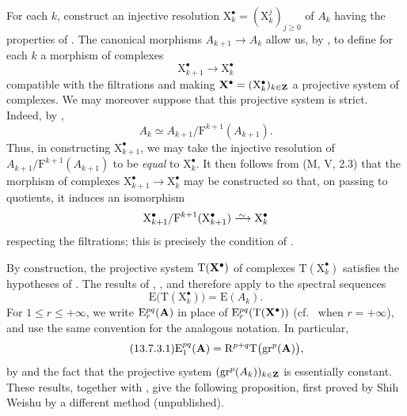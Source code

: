 \begin{env}[13.7.2]
\label{0.13.7.2}
For each $k$, construct an injective resolution
$\mathrm{X}_k^\bullet=(\mathrm{X}_k^j)_{j\geq0}$ of $A_k$ having the
properties of .
The canonical morphisms $A_{k+1}\longrightarrow A_k$ allow us, by
, to define for each $k$ a morphism of complexes
\[
  \mathrm{X}_{k+1}^\bullet\longrightarrow\mathrm{X}_k^\bullet
\]
compatible with the filtrations and making
$\mathbf{X}^\bullet=(\mathrm{X}_k^\bullet)_{k\in\mathbf{Z}}$ a projective
system of complexes.
We may moreover suppose that this projective system is strict.
Indeed, by ,
\[
  A_k
  \simeq
  A_{k+1}/\mathrm{F}^{k+1}(A_{k+1}).
\]
Thus, in constructing $\mathrm{X}_{k+1}^\bullet$, we may take the
injective resolution of
$A_{k+1}/\mathrm{F}^{k+1}(A_{k+1})$ to be
\emph{equal} to $\mathrm{X}_k^\bullet$.
It then follows from (M, V, 2.3) that the morphism of complexes
$\mathrm{X}_{k+1}^\bullet\longrightarrow\mathrm{X}_k^\bullet$ may be
constructed so that, on passing to quotients, it induces an
isomorphism
\[
  \mathrm{X}_{k+1}^\bullet/
  \mathrm{F}^{k+1}(\mathrm{X}_{k+1}^\bullet)
  \simto
  \mathrm{X}_k^\bullet
\]
respecting the filtrations; this is precisely the condition of
.
\end{env}

\begin{env}[13.7.3]
\label{0.13.7.3}
By construction, the projective system
$\mathrm{T}(\mathbf{X}^\bullet)$ of complexes
$\mathrm{T}(\mathrm{X}_k^\bullet)$ satisfies the hypotheses of
.
The results of , , and
 therefore apply to the spectral sequences
\[
  \mathrm{E}\bigl(\mathrm{T}(\mathrm{X}_k^\bullet)\bigr)
  =
  \mathrm{E}(A_k).
\]
For $1\leq r\leq+\infty$, we write
$\mathrm{E}_r^{pq}(\mathbf{A})$ in place of
$\mathrm{E}_r^{pq}(\mathrm{T}(\mathbf{X}^\bullet))$
(cf.\  when $r=+\infty$), and use the same convention
for the analogous notation.
In particular,
\begin{equation}
\label{0.13.7.3.1}
\tag{13.7.3.1}
  \mathrm{E}_1^{pq}(\mathbf{A})
  =
  \mathrm{R}^{p+q}\mathrm{T}\bigl(\mathrm{gr}^p(\mathbf{A})\bigr),
\end{equation}
by  and the fact that the projective system
$(\mathrm{gr}^p(A_k))_{k\in\mathbf{Z}}$ is essentially constant.
These results, together with , give the following
proposition, first proved by Shih Weishu by a different method
(unpublished).
\end{env}

